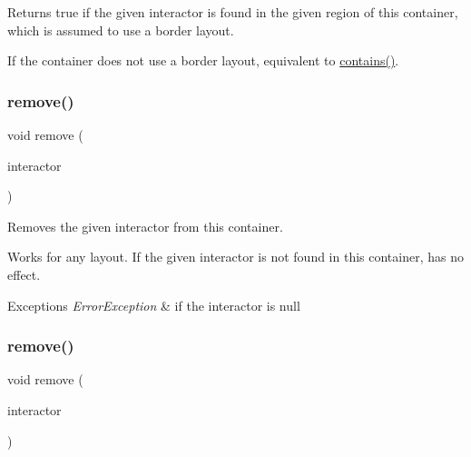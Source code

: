 Returns true if the given interactor is found in the given region of this container, which is assumed to use a border layout. 

If the container does not use a border layout, equivalent to \mbox{\hyperlink{classGContainer_a29e67f98cd36414c67475b8941d861a6}{contains()}}. \mbox{\label{classGContainer_a1c12b1fde5c2ef10d79d4ee51e670efa}} 
\subsubsection{\texorpdfstring{remove()}{remove()}\hspace{0.1cm}{\footnotesize\ttfamily [1/3]}}
{\footnotesize\ttfamily void remove (\begin{DoxyParamCaption}\item[{\mbox{\hyperlink{classGInteractor}{G\+Interactor}} $\ast$}]{interactor }\end{DoxyParamCaption})\hspace{0.3cm}{\ttfamily [virtual]}}



Removes the given interactor from this container. 

Works for any layout. If the given interactor is not found in this container, has no effect. 
\begin{DoxyExceptions}{Exceptions}
{\em Error\+Exception} & if the interactor is null \\
\hline
\end{DoxyExceptions}
\mbox{\label{classGContainer_ade2376c458ac401a0bd2dbe44271509e}} 
\subsubsection{\texorpdfstring{remove()}{remove()}\hspace{0.1cm}{\footnotesize\ttfamily [2/3]}}
{\footnotesize\ttfamily void remove (\begin{DoxyParamCaption}\item[{\mbox{\hyperlink{classGInteractor}{G\+Interactor}} \&}]{interactor }\end{DoxyParamCaption})\hspace{0.3cm}{\ttfamily [virtual]}}



